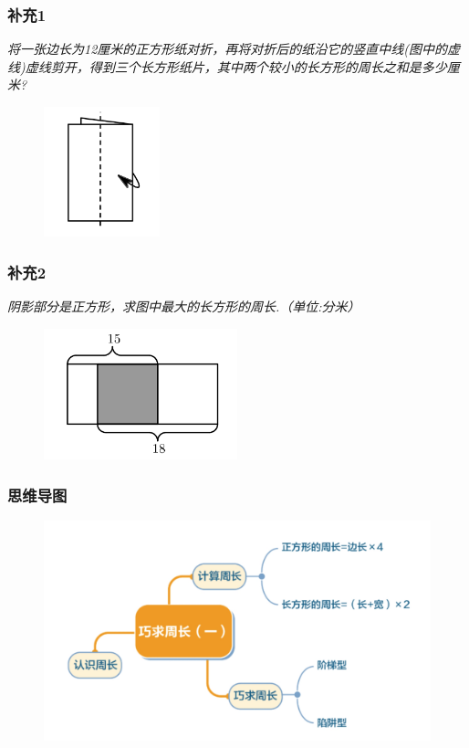 \begin{frame}
    \frametitle{补充1}
    \textit{将一张边长为12厘米的正方形纸对折，再将对折后的纸沿它的竖直中线(图中的虚线)虚线剪开，得到三个长方形纸片，其中两个较小的长方形的周长之和是多少厘米?}
    \begin{figure}[H] 
        \centering
        \includegraphics[width=0.3\textwidth]{./pics/Chapter_1/buchong1.png}
    \end{figure}
\end{frame}

\begin{frame}
    \frametitle{补充2}
    \textit{阴影部分是正方形，求图中最大的长方形的周长.（单位:分米）}
    \begin{figure}[H] 
        \centering
        \includegraphics[width=0.5\textwidth]{./pics/Chapter_1/buchong2.png}
    \end{figure}
\end{frame}

\begin{frame}
    \frametitle{思维导图}
    \begin{figure}[H] 
        \centering
        \includegraphics[width=1\textwidth]{./pics/Chapter_1/siweidaotu.png}
    \end{figure}
\end{frame}